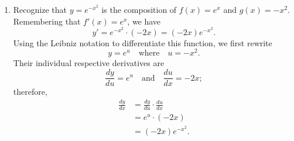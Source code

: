 \begin{example}
\begin{enumerate}[1)]
\item Recognize  that $y = e^{-x^2}$ is the composition of $f(x) = e^x$ and $g(x) = -x^2$. Remembering that $f'(x) = e^x$, we have 
$$y' = e^{-x^2}\cdot (-2x) = (-2x)e^{-x^2}.$$
Using the Leibniz notation to differentiate this function, we first rewrite
\[ y = e^{u} \quad \mbox{where} \quad u = -x^2. \]
Their individual respective derivatives are
\[ \frac{dy}{du} = e^u \quad \mbox{and} \quad \frac{du}{dx} = -2x; \]
therefore,
\begin{align*}
\frac{dy}{dx} &= \frac{dy}{du} \cdot \frac{du}{dx} \\
&= e^u \cdot (-2x) \\
&= (-2x)e^{-x^2}.
\end{align*}
\end{enumerate}

\end{example}
